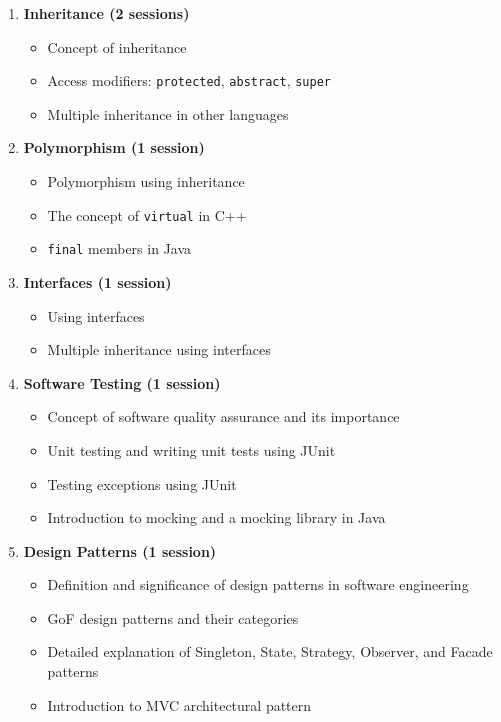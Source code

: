 \documentclass[12pt]{article}
\begin{document}
\begin{enumerate}
    \item \textbf{Inheritance (2 sessions)}
        \begin{itemize}
            \item Concept of inheritance
            \item Access modifiers: \texttt{protected}, \texttt{abstract}, \texttt{super}
            \item Multiple inheritance in other languages
        \end{itemize}
    
    \item \textbf{Polymorphism (1 session)}
        \begin{itemize}
            \item Polymorphism using inheritance
            \item The concept of \texttt{virtual} in C++
            \item \texttt{final} members in Java
        \end{itemize}
    
    \item \textbf{Interfaces (1 session)}
        \begin{itemize}
            \item Using interfaces
            \item Multiple inheritance using interfaces
        \end{itemize}
    
    \item \textbf{Software Testing (1 session)}
        \begin{itemize}
            \item Concept of software quality assurance and its importance
            \item Unit testing and writing unit tests using JUnit
            \item Testing exceptions using JUnit
            \item Introduction to mocking and a mocking library in Java
        \end{itemize}
    
    \item \textbf{Design Patterns (1 session)}
        \begin{itemize}
            \item Definition and significance of design patterns in software engineering
            \item GoF design patterns and their categories
            \item Detailed explanation of Singleton, State, Strategy, Observer, and Facade patterns
            \item Introduction to MVC architectural pattern
        \end{itemize}
    

\end{enumerate}
\end{document}
